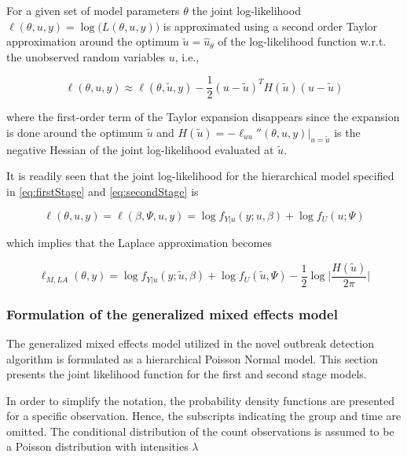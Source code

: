 \documentclass[preprint, 3p, authoryear]{elsarticle} %
\begin{document}
For a given set of model parameters \(\theta\) the joint log-likelihood \(\ell(\theta, u, y)=\log\big(L(\theta, u, y)\big)\) is approximated using a second order Taylor approximation around the optimum \(\tilde{u}=\hat{u}_\theta\) of the log-likelihood function w.r.t. the unobserved random variables \(u\), i.e.,

\begin{equation}\label{eq:laplaceApprox}
  \ell(\theta, u, y)\approx\ell(\theta, \tilde{u}, y) - \frac{1}{2}(u-\tilde{u})^T H(\tilde{u})(u-\tilde{u})
\end{equation}

where the first-order term of the Taylor expansion disappears since the expansion is done around the optimum \(\tilde {u}\) and \(H(\tilde{u})=-\ell_{uu}''(\theta, u, y)|_{u=\tilde{u}}\) is the negative Hessian of the joint log-likelihood evaluated at \(\tilde{u}\).

It is readily seen that the joint log-likelihood for the hierarchical model specified in \ref{eq:firstStage} and \ref{eq:secondStage} is

\begin{equation}
  \ell(\theta, u, y) = \ell(\beta, \Psi, u, y) = \log f_{Y|u}(y;u,\beta)+\log f_U(u;\Psi)
\end{equation}

which implies that the Laplace approximation becomes

\begin{equation}
  \ell_{M,LA}(\theta, y)=\log f_{Y|u}(y; \tilde{u},\beta)+\log f_U(\tilde{u}, \Psi)-\frac{1}{2}\log\Bigg|\frac{H(\tilde{u})}{2\pi}\Bigg|
\end{equation}

\hypertarget{formulation-of-the-generalized-mixed-effects-model}{%
\subsubsection{Formulation of the generalized mixed effects model}\label{formulation-of-the-generalized-mixed-effects-model}}

The generalized mixed effects model utilized in the novel outbreak detection algorithm is formulated as a hierarchical Poisson Normal model. This section presents the joint likelihood function for the first and second stage models.

In order to simplify the notation, the probability density functions are presented for a specific observation. Hence, the subscripts indicating the group and time are omitted. The conditional distribution of the count observations is assumed to be a Poisson distribution with intensities \(\lambda\)
\end{document}
